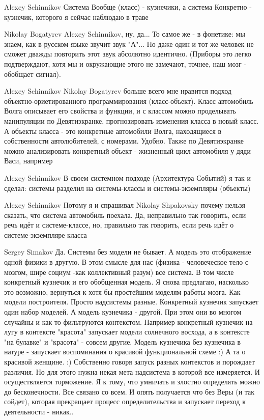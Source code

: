 \documentclass[11pt,a4paper]{article}
\begin{document}
Alexey Schinnikov Система Вообще (класс) - кузнечики, а система Конкретно -
кузнечик, которого я сейчас наблюдаю в траве

Nikolay Bogatyrev Alexey Schinnikov, ну, да... То самое же - в фонетике: мы
знаем, как в русском языке звучит звук "А"... Но даже один и тот же человек не
сможет дважды повторить этот звук абсолютно идентично. (Приборы это легко
подтверждают, хотя мы и окружающие этого не замечают, точнее, наш мозг -
обобщает сигнал).

Alexey Schinnikov Nikolay Bogatyrev больше всего мне нравится подход
объектно-ориетированного программирования (класс-объект). Класс автомобиль
Волга описывает его свойства и функции, и с классом можно проделывать
манипуляции по Девятиэкранке, прогнозировать изменения класса в новый класс. А
объекты класса - это конкретные автомобили Волга, находящиеся в собственности
автолюбителей, с номерами. Удобно. Также по Девятиэкранке можно анализировать
конкретный объект - жизненный цикл автомобиля у дяди Васи, например

Alexey Schinnikov В своем системном подходе (Архитектура Событий) я так и
сделал: системы разделил на системы-классы и системы-экземпляры (объекты)

Alexey Schinnikov Потому я и спрашивал Nikolay Shpakovsky почему нельзя
сказать, что система автомобиль поехала. Да, неправильно так говорить, если
речь идёт и системе-классе, но, правильно так говорить, если речь идёт о
системе-экземпляре класса

Sergey Simakov Да. Системы без модели не бывает. А модель это отображение
одной физики в другую. В этом смысле для нас (физика - человеческое тело с
мозгом, шире социум -как коллективный разум) все система. В том числе
конкретный кузнечик и его обобщенная модель. Я снова предлагаю, насколько это
возможно, вернуться к хотя бы простейшим моделям работы мозга. Как модели
построителя.  Просто надсистемы разные. Конкретный кузнечик запускает один
набор моделей. А модель кузнечика - другой. При этом они во многом случайны и
как то фильтруются контекстом.  Например конкретный кузнечик на лугу в
контексте "красота" запускает модели солнечного восхода, а в контексте "на
булавке" и "красота" - совсем другие.  Модель кузнечика без кузнечика в натуре -
запускает воспоминания о красивой функциональной схеме :) А та о красивой
женщине. :) Собственно говоря запуск разных контекстов и порождает
различия. Но для этого нужна некая мета надсистема в которой все измеряется. И
осуществляется торможение.  Я к тому, что умничать и злостно определять можно
до бесконечности. Все связано со всем.  И опять получается что без Веры (и так
сойдет), которая прекращает процесс определительства и запускает переход к
деятельности - никак..
\end{document}
